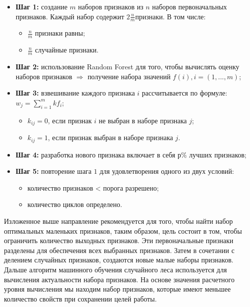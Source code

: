 \begin{itemize}
	\item \textbf{Шаг 1:} создание $m$ наборов признаков из $n$ наборов первоначальных признаков. Каждый набор содержит $2 \frac{n}{m} $признаки. В том числе:
	
	\begin{itemize}
		\item  $\frac{n}{m}$ признаки равны;
		\item  $\frac{n}{m}$ случайные признаки.

	\end{itemize}
	
	\item \textbf{Шаг 2:} использование Random Forest для того, чтобы вычислять оценку наборов признаков $\Rightarrow$ получение набора значений $f\left(i\right), i= \left(1,..., m\right)$;
	\item \textbf{Шаг 3:} взвешивание каждого признака $i$ рассчитывается по формуле:
	$w_j= \sum^m_{i=1}kf_i$;
	
	\begin{itemize}
		\item $k_{ij} = 0$, если признак $i$ не выбран в наборе признака $j$;
    \item $k_{ij}= 1$, если признак выбран в наборе признака $j$.
	\end{itemize}
	
	\item \textbf{Шаг 4:} разработка нового признака включает в себя $р\%$ лучших признаков;
	\item \textbf{Шаг 5:} повторение шага $1$ для удовлетворения одного из двух условий:
	
	\begin{itemize}
		\item количество признаков < порога разрешено;
		\item количество циклов определено.
	\end{itemize}
	
\end{itemize}

Изложенное выше направление рекомендуется для того, чтобы найти набор оптимальных маленьких признаков, таким образом, цель состоит в том, чтобы ограничить количество выходных признаков. Эти первоначальные признаки разделены для обеспечения всех выбранных признаков. Затем в сочетании с делением случайных признаков, создаются новые малые наборы признаков. Дальше алгоритм машинного обучения случайного леса используется для вычисления актуальности набора признаков. На основе значения расчетного уровня вычисления мы находим набор признаков, которые имеют меньшее количество свойств при сохранении целей работы.
